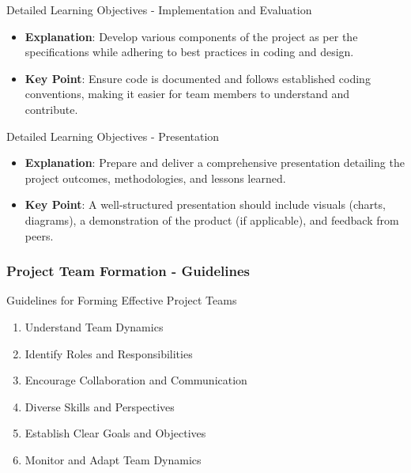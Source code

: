 \documentclass[aspectratio=169]{beamer}
\begin{document}
\begin{frame}[fragile]{Detailed Learning Objectives - Implementation and Evaluation}
  \begin{itemize}
    \item \textbf{Explanation}: Develop various components of the project as per the specifications while adhering to best practices in coding and design.
    \item \textbf{Key Point}: Ensure code is documented and follows established coding conventions, making it easier for team members to understand and contribute.
  \end{itemize}
\end{frame}

\begin{frame}[fragile]{Detailed Learning Objectives - Presentation}
  \begin{itemize}
    \item \textbf{Explanation}: Prepare and deliver a comprehensive presentation detailing the project outcomes, methodologies, and lessons learned.
    \item \textbf{Key Point}: A well-structured presentation should include visuals (charts, diagrams), a demonstration of the product (if applicable), and feedback from peers.
  \end{itemize}
\end{frame}

\begin{frame}[fragile]
    \frametitle{Project Team Formation - Guidelines}
    \begin{block}{Guidelines for Forming Effective Project Teams}
        \begin{enumerate}
            \item Understand Team Dynamics
            \item Identify Roles and Responsibilities
            \item Encourage Collaboration and Communication
            \item Diverse Skills and Perspectives
            \item Establish Clear Goals and Objectives
            \item Monitor and Adapt Team Dynamics
        \end{enumerate}
    \end{block}
\end{frame}
\end{document}
